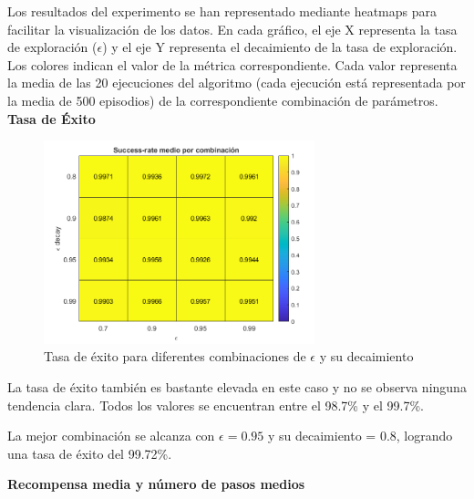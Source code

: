 Los resultados del experimento se han representado mediante heatmaps para facilitar la visualización de los datos. En cada gráfico, el eje X representa la tasa de exploración ($\epsilon$) y el eje Y representa el decaimiento de la tasa de exploración. Los colores indican el valor de la métrica correspondiente. Cada valor representa la media de las 20 ejecuciones del algoritmo (cada ejecución está representada por la media de 500 episodios) de la correspondiente combinación de parámetros. 
\\

\textbf{Tasa de Éxito}

\begin{figure}[H]
    \centering
    \includegraphics[width=0.7\textwidth]{../../experiments/qlearning/experiment-2/results/success.png}
    \caption{Tasa de éxito para diferentes combinaciones de $\epsilon$ y su decaimiento}
    \label{fig:qlearning-success}
\end{figure}
La tasa de éxito también es bastante elevada en este caso y no se observa ninguna tendencia clara. Todos los valores se encuentran entre el 98.7\% y el 99.7\%.

La mejor combinación se alcanza con $\epsilon = 0.95$ y su decaimiento = 0.8, logrando una tasa de éxito del 99.72\%.


\newpage

\textbf{Recompensa media y número de pasos medios}

